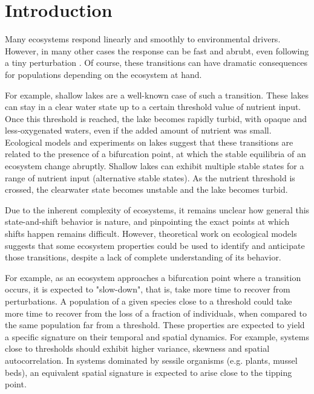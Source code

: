 \documentclass{article}
\begin{document}
\section{Introduction}

Many ecosystems respond linearly and smoothly to environmental drivers. However, 
in many other cases the response can be fast and abrubt, even following a tiny 
perturbation \citep{scheffer2003a}. Of course, these transitions can have 
dramatic consequences for populations depending on the ecosystem at hand. 

For example, shallow lakes are a well-known case of such a transition. These 
lakes can stay in a clear water state up to a certain threshold value of 
nutrient input. Once this threshold is reached, the lake becomes rapidly turbid, 
with opaque and less-oxygenated waters, even if the added amount of nutrient was 
small. Ecological models and experiments on lakes suggest that these transitions 
are related to the presence of a bifurcation point, at which the stable 
equilibria of an ecosystem change abruptly. Shallow lakes can exhibit multiple 
stable states for a range of nutrient input (alternative stable states). As the 
nutrient threshold is crossed, the clearwater state becomes unstable and the 
lake becomes turbid.


Due to the inherent complexity of ecosystems, it remains unclear how general 
this state-and-shift behavior is nature, and pinpointing the exact points at 
which shifts happen remains difficult. However, theoretical work on ecological 
models suggests that some ecosystem properties could be used to identify and 
anticipate those transitions, despite a lack of complete understanding of its 
behavior. 

For example, as an ecosystem approaches a bifurcation point where a transition 
occurs, it is expected to "slow-down", that is, take more time to recover from 
perturbations. A population of a given species close to a threshold could take 
more time to recover from the loss of a fraction of individuals, when compared 
to the same population far from a threshold. These properties are expected to 
yield a specific signature on their temporal and spatial dynamics. For example, 
systems close to thresholds should exhibit higher variance, skewness and spatial 
autocorrelation. In systems dominated by sessile organisms (e.g. plants, mussel
beds), an equivalent spatial signature is expected to arise close to the tipping 
point. 
\end{document}
